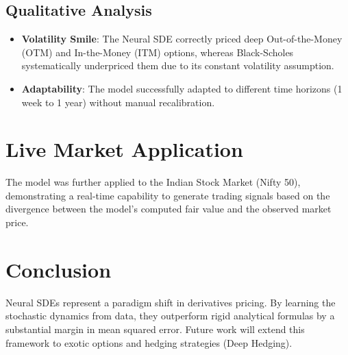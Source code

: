 \documentclass{article}
\begin{document}
\subsection{Qualitative Analysis}
\begin{itemize}
    \item \textbf{Volatility Smile}: The Neural SDE correctly priced deep Out-of-the-Money (OTM) and In-the-Money (ITM) options, whereas Black-Scholes systematically underpriced them due to its constant volatility assumption.
    \item \textbf{Adaptability}: The model successfully adapted to different time horizons (1 week to 1 year) without manual recalibration.
\end{itemize}

\section{Live Market Application}
The model was further applied to the Indian Stock Market (Nifty 50), demonstrating a real-time capability to generate trading signals based on the divergence between the model's computed fair value and the observed market price.

\section{Conclusion}
Neural SDEs represent a paradigm shift in derivatives pricing. By learning the stochastic dynamics from data, they outperform rigid analytical formulas by a substantial margin in mean squared error. Future work will extend this framework to exotic options and hedging strategies (Deep Hedging).
\end{document}
